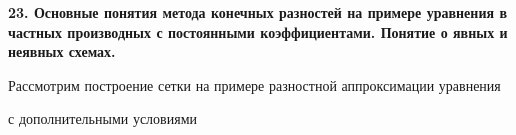 \documentclass[a4paper,14pt]{article}
\begin{document}
\textbf{23. Основные понятия метода конечных разностей на примере уравнения в частных производных с постоянными коэффициентами. Понятие о явных и неявных схемах.}
\newpage
\begin{figure}[!h]
	\label{fig:t231}
\end{figure}

Рассмотрим построение сетки на примере разностной аппроксимации уравнения

\begin{figure}[!h]
	\label{fig:t232}
\end{figure}

с дополнительными условиями

\begin{figure}[!h]
	\label{fig:t233}
\end{figure}

\begin{figure}[!h]
	\label{fig:t234}
\end{figure}
\end{document}
